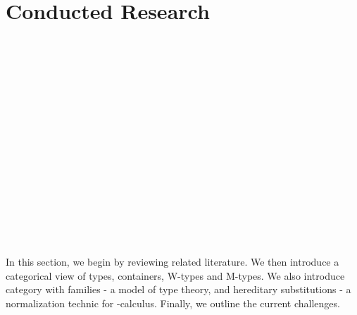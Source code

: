 \chapter{Conducted Research}

\begin{code}[hide]%
\>[0]\AgdaSymbol{\{-\#}\AgdaSpace{}%
\AgdaSpace{}%
\AgdaSpace{}%
\AgdaSymbol{\#-\}}\<%
\\
%
\\[\AgdaEmptyExtraSkip]%
\>[0]\AgdaSpace{}%
\AgdaSpace{}%
\<%
\\
\>[0]\AgdaSpace{}%
\AgdaSpace{}%
\<%
\\
\>[0]\AgdaSpace{}%
\AgdaSpace{}%
\<%
\\
\>[0]\AgdaSpace{}%
\AgdaSpace{}%
\<%
\\
\>[0]\AgdaSpace{}%
\AgdaSpace{}%
\<%
\\
\>[0]\AgdaSpace{}%
\AgdaSpace{}%
\<%
\\
%
\\[\AgdaEmptyExtraSkip]%
\>[0]\AgdaSpace{}%
\AgdaSymbol{:}\AgdaSpace{}%
\<%
\\
\>[0]\AgdaSpace{}%
\AgdaSymbol{=}\AgdaSpace{}%
\<%
\\
%
\\[\AgdaEmptyExtraSkip]%
\>[0]\AgdaSpace{}%
\AgdaSymbol{:}\AgdaSpace{}%
\<%
\\
\>[0]\AgdaSpace{}%
\AgdaSymbol{=}\AgdaSpace{}%
\<%
\\
%
\\[\AgdaEmptyExtraSkip]%
\>[0]\AgdaSpace{}%
\AgdaSpace{}%
\AgdaSpace{}%
\AgdaSpace{}%
\AgdaSymbol{:}\AgdaSpace{}%
\<%
\end{code}

In this section, we begin by reviewing related literature. We then introduce a categorical view of types, containers, W-types and M-types. We also introduce category with families - a model of type theory, and hereditary substitutions - a normalization technic for \lambda-calculus. Finally, we outline the current challenges.

